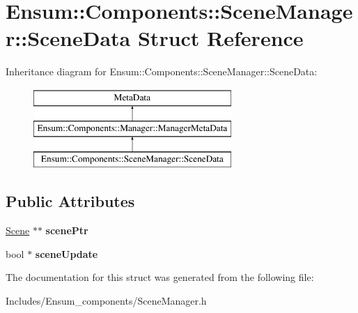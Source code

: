 \hypertarget{struct_ensum_1_1_components_1_1_scene_manager_1_1_scene_data}{}\section{Ensum\+:\+:Components\+:\+:Scene\+Manager\+:\+:Scene\+Data Struct Reference}
\label{struct_ensum_1_1_components_1_1_scene_manager_1_1_scene_data}
Inheritance diagram for Ensum\+:\+:Components\+:\+:Scene\+Manager\+:\+:Scene\+Data\+:\begin{figure}[H]
\begin{center}
\leavevmode
\includegraphics[height=3.000000cm]{struct_ensum_1_1_components_1_1_scene_manager_1_1_scene_data}
\end{center}
\end{figure}
\subsection*{Public Attributes}
\begin{DoxyCompactItemize}
\item 
\hyperlink{class_ensum_1_1_components_1_1_scene}{Scene} $\ast$$\ast$ {\bfseries scene\+Ptr}\hypertarget{struct_ensum_1_1_components_1_1_scene_manager_1_1_scene_data_ac37964615c53887051adcc587fa9dab0}{}\label{struct_ensum_1_1_components_1_1_scene_manager_1_1_scene_data_ac37964615c53887051adcc587fa9dab0}

\item 
bool $\ast$ {\bfseries scene\+Update}\hypertarget{struct_ensum_1_1_components_1_1_scene_manager_1_1_scene_data_a7d4a9e3d7aed5dc8f338b4d4a312f875}{}\label{struct_ensum_1_1_components_1_1_scene_manager_1_1_scene_data_a7d4a9e3d7aed5dc8f338b4d4a312f875}

\end{DoxyCompactItemize}


The documentation for this struct was generated from the following file\+:\begin{DoxyCompactItemize}
\item 
Includes/\+Ensum\+\_\+components/Scene\+Manager.\+h\end{DoxyCompactItemize}
